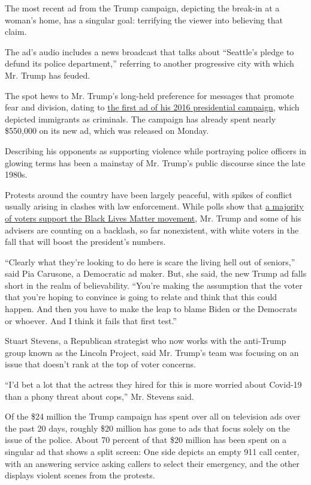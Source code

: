 The most recent ad from the Trump campaign, depicting the break-in at a
woman's home, has a singular goal: terrifying the viewer into believing
that claim.

The ad's audio includes a news broadcast that talks about ``Seattle's
pledge to defund its police department,'' referring to another
progressive city with which Mr. Trump has feuded.

The spot hews to Mr. Trump's long-held preference for messages that
promote fear and division, dating to
\href{https://www.nytimes.com/2016/01/05/us/politics/in-first-ad-donald-trump-plays-to-fears-on-immigration-and-isis.html}{the
first ad of his 2016 presidential campaign}, which depicted immigrants
as criminals. The campaign has already spent nearly \$550,000 on its new
ad, which was released on Monday.

Describing his opponents as supporting violence while portraying police
officers in glowing terms has been a mainstay of Mr. Trump's public
discourse since the late 1980s.

Protests around the country have been largely peaceful, with spikes of
conflict usually arising in clashes with law enforcement. While polls
show that
\href{https://www.nytimes.com/interactive/2020/06/10/upshot/black-lives-matter-attitudes.html}{a
majority of voters support the Black Lives Matter movement}, Mr. Trump
and some of his advisers are counting on a backlash, so far nonexistent,
with white voters in the fall that will boost the president's numbers.

``Clearly what they're looking to do here is scare the living hell out
of seniors,'' said Pia Carusone, a Democratic ad maker. But, she said,
the new Trump ad falls short in the realm of believability. ``You're
making the assumption that the voter that you're hoping to convince is
going to relate and think that this could happen. And then you have to
make the leap to blame Biden or the Democrats or whoever. And I think it
fails that first test.''

Stuart Stevens, a Republican strategist who now works with the
anti-Trump group known as the Lincoln Project, said Mr. Trump's team was
focusing on an issue that doesn't rank at the top of voter concerns.

``I'd bet a lot that the actress they hired for this is more worried
about Covid-19 than a phony threat about cops,'' Mr. Stevens said.

Of the \$24 million the Trump campaign has spent over all on television
ads over the past 20 days, roughly \$20 million has gone to ads that
focus solely on the issue of the police. About 70 percent of that \$20
million has been spent on a singular ad that shows a split screen: One
side depicts an empty 911 call center, with an answering service asking
callers to select their emergency, and the other displays violent scenes
from the protests.

